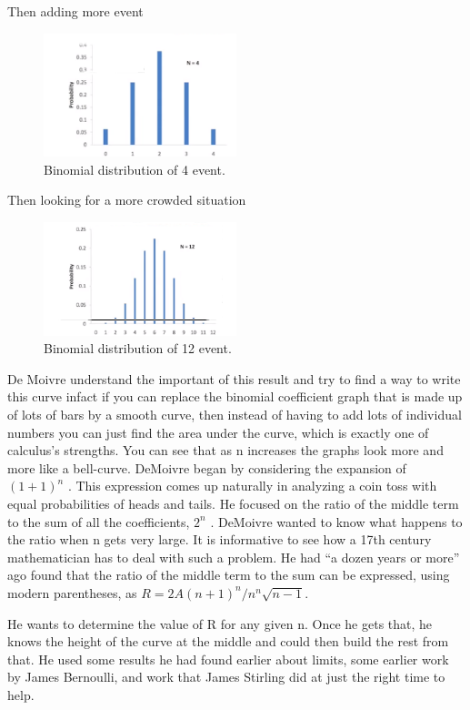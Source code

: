 \documentclass{article}
\begin{document}
Then adding more event

\begin{figure}[H]
\centering
\includegraphics[width=0.5\textwidth]{images/1.png}
\caption{\label{fig:bin4}Binomial distribution of 4 event.}
\end{figure}
Then looking for a more crowded situation
\begin{figure}[H]
\centering
\includegraphics[width=0.5\textwidth]{images/2.png}
\caption{\label{fig:bin12}Binomial distribution of 12 event.}
\end{figure}

De Moivre understand the important of this result and try to find a way to write this curve
infact if you can replace the binomial coefficient graph that is made up of lots of bars by a smooth curve, then
instead of having to add lots of individual numbers you can just find the area under the curve, which is
exactly one of calculus’s strengths. You can see that as n increases the graphs look more and more like a
bell-curve.
DeMoivre began by considering the expansion of $ (1+1)^{n} $ . This expression comes up naturally in
analyzing a coin toss with equal probabilities of heads and tails. He focused on the ratio of the middle
term to the sum of all the coefficients, $ 2^n $ .
DeMoivre wanted to know what happens to the ratio when n gets very large. It is informative to see how a 17th century mathematician has to deal with such a problem.
He had “a dozen years or more” ago found that the ratio of the middle term to the sum can be expressed, using modern parentheses, as  $ R= 2A(n+1)^{n} / n^{n} \sqrt{n-1} $.

He wants to determine the value of R for any given n. Once he gets that, he knows the height of the curve at the middle and could then build the rest from that. He used some results he had found earlier about limits, some earlier work by James Bernoulli, and work that James Stirling did at just the right time to help.
\end{document}
